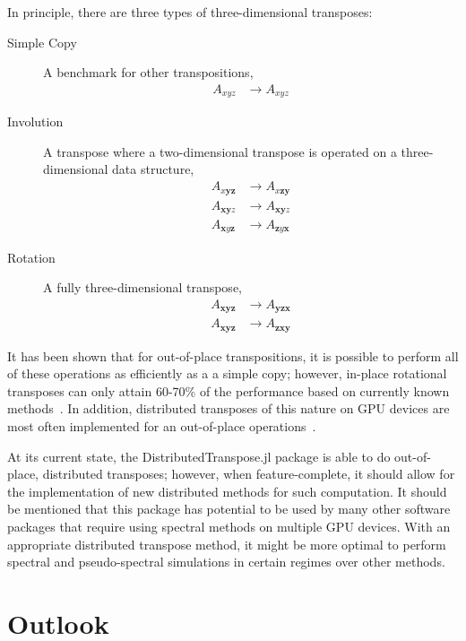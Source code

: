 In principle, there are three types of three-dimensional transposes:

\begin{description}
\item[Simple Copy]{A benchmark for other transpositions,
    \begin{align}
    A_{xyz} &\rightarrow A_{xyz}
    \end{align}}
\item[Involution]{A transpose where a two-dimensional transpose is operated on a three-dimensional data structure,
    \begin{align}
    A_{x\mathbf{yz}} &\rightarrow A_{x\mathbf{zy}} \\
    A_{\mathbf{xy}z} &\rightarrow A_{\mathbf{xy}z} \\
    A_{\mathbf{x}y\mathbf{z}} &\rightarrow A_{\mathbf{z}y\mathbf{x}}
    \end{align}}
\item[Rotation]{A fully three-dimensional transpose,
    \begin{align}
    A_{\mathbf{xyz}} &\rightarrow A_{\mathbf{yzx}} \\
    A_{\mathbf{xyz}} &\rightarrow A_{\mathbf{zxy}}
    \end{align}}
\end{description}

It has been shown that for out-of-place transpositions, it is possible to perform all of these operations as efficiently as a a simple copy; however, in-place rotational transposes can only attain 60-70\% of the performance based on currently known methods~\cite{jodra2015, el2008}.
In addition, distributed transposes of this nature on GPU devices are most often implemented for an out-of-place operations~\cite{ruetsch2013}.

At its current state, the DistributedTranspose.jl package is able to do out-of-place, distributed transposes; however, when feature-complete, it should allow for the implementation of new distributed methods for such computation.
It should be mentioned that this package has potential to be used by many other software packages that require using spectral methods on multiple GPU devices.
With an appropriate distributed transpose method, it might be more optimal to perform spectral and pseudo-spectral simulations in certain regimes over other methods.

\section{Outlook}

